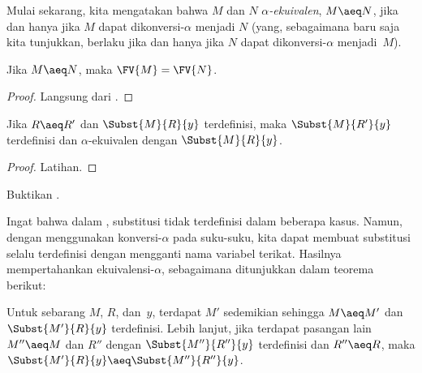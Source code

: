 \documentclass[../../../include/open-logic-section]{subfiles}
\begin{document}
Mulai sekarang, kita mengatakan bahwa $M$ dan $N$ \emph{$\alpha$-ekuivalen},
$M \aeq N$, jika dan hanya jika $M$ dapat dikonversi-$\alpha$ menjadi $N$
(yang, sebagaimana baru saja kita tunjukkan, berlaku jika dan hanya jika $N$
dapat dikonversi-$\alpha$ menjadi~$M$).

\begin{thm}
  Jika $M \aeq N$, maka $\FV{M} = \FV{N}$.
\end{thm}

\begin{proof}
  Langsung dari .
\end{proof}

\begin{lem}
  Jika $R \aeq R'$ dan $\Subst{M}{R}{y}$ terdefinisi, maka
  $\Subst{M}{R'}{y}$ terdefinisi dan $\alpha$-ekuivalen dengan
  $\Subst{M}{R}{y}$.
\end{lem}

\begin{proof}
  Latihan.
\end{proof}

\begin{prob}
  Buktikan .
\end{prob}

Ingat bahwa dalam , substitusi tidak terdefinisi dalam
beberapa kasus. Namun, dengan menggunakan konversi-$\alpha$ pada suku-suku,
kita dapat membuat substitusi selalu terdefinisi dengan mengganti nama
variabel terikat. Hasilnya mempertahankan ekuivalensi-$\alpha$, sebagaimana
ditunjukkan dalam teorema berikut:

\begin{thm}
  Untuk sebarang $M$, $R$, dan~$y$, terdapat $M'$ sedemikian sehingga
  $M \aeq M'$ dan $\Subst{M'}{R}{y}$ terdefinisi. Lebih lanjut, jika terdapat
  pasangan lain $M'' \aeq M$ dan $R''$ dengan $\Subst{M''}{R''}{y}$
  terdefinisi dan $R'' \aeq R$, maka
  $\Subst{M'}{R}{y} \aeq \Subst{M''}{R''}{y}$.
\end{thm}
\end{document}
